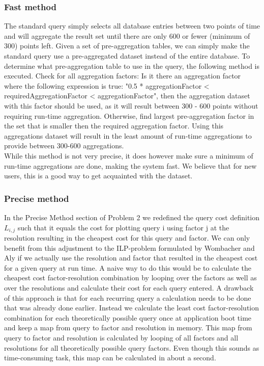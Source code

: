 \subsubsection{Fast method}
The standard query simply selects all database entries between two points of time and will aggregate the result set until there are only 600 or fewer (minimum of 300) points left. Given a set of pre-aggregation tables, we can simply make the standard query use a pre-aggregated dataset instead of the entire database. To determine what pre-aggregation table to use in the query, the following method is executed. Check for all aggregation factors: Is it there an aggregation factor where the following expression is true: "0.5 * aggregationFactor < requiredAggregationFactor < aggregationFactor", then the aggregation dataset with this factor should be used, as it will result between 300 - 600 points without requiring run-time aggregation. Otherwise, find largest pre-aggregation factor in the set that is smaller then the required aggregation factor. Using this aggregations dataset will result in the least amount of run-time aggregations to provide between 300-600 aggregations.\\

While this method is not very precise, it does however make sure a minimum of run-time aggregations are done, making the system fast. We believe that for new users, this is a good way to get acquainted with the dataset.

\subsubsection{Precise method}
In the Precise Method section of Problem 2 we redefined the query cost definition $L_{i,j}$ such that it equals the cost for plotting query i using factor j at the resolution resulting in the cheapest cost for this query and factor. We can only benefit from this adjustment to the ILP-problem formulated by Wombacher and Aly \cite{wombacher2011} if we actually use the resolution and factor that resulted in the cheapest cost for a given query at run time. A naive way to do this would be to calculate the cheapest cost factor-resolution combination by looping over the factors as well as over the resolutions and calculate their cost for each query entered. A drawback of this approach is that for each recurring query a calculation needs to be done that was already done earlier. Instead we calculate the least cost factor-resolution combination for each theoretically possible query once at application boot time and keep a map from query to factor and resolution in memory. This map from query to factor and resolution is calculated by looping of all factors and all resolutions for all theoretically possible query factors. Even though this sounds as time-consuming task, this map can be calculated in about a second.

